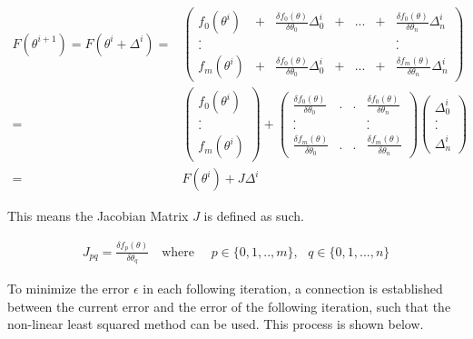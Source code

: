 \begin{align}
	F(\theta^{i+1}) = F(\theta^{i} + \Delta^{i}) =&
		\begin{pmatrix} f_0(\theta^{i}) &+& \frac{\delta f_0(\theta)}{\delta \theta_0} \Delta^{i}_0 &+& ... &+&  \frac{\delta f_0(\theta)}{\delta \theta_n} \Delta^{i}_n  \\
				. && && && . \\
				. && && && . \\
				f_m(\theta^{i}) &+& \frac{\delta f_0(\theta)}{\delta \theta_0} \Delta^{i}_0 &+& ... &+&  \frac{\delta f_m(\theta)}{\delta \theta_n} \Delta^{i}_n 
		\end{pmatrix} \label{eq:taylor1} \\
	=& \begin{pmatrix} f_0(\theta^{i}) \\ . \\ . \\ f_m(\theta^{i})  \end{pmatrix} +
		\begin{pmatrix} \frac{\delta f_0(\theta)}{\delta \theta_0} & . & . & \frac{\delta f_0(\theta)}{\delta \theta_n}  \\
					   . &&& . \\
					   . &&& . \\
					   \frac{\delta f_m(\theta)}{\delta \theta_0} & . & . & \frac{\delta f_m(\theta)}{\delta \theta_n}
		\end{pmatrix} \begin{pmatrix} \Delta^{i}_0 \\ . \\ . \\ \Delta^{i}_n \end{pmatrix}  \label{eq:taylor2} \\
	=& F(\theta^{i}) + J \Delta^{i} \label{eq:taylor3}
\end{align}

This means the Jacobian Matrix $J$ is defined as such.

\begin{align}
	J_{pq} = \frac{\delta f_p(\theta)}{\delta \theta_q} \quad \text{where } \quad p \in \{0,1,..,m\},\text{ } q \in \{0,1,...,n\}
\end{align}

To minimize the error $\epsilon$ in each following iteration, a connection is established between the current error and the
error of the following iteration, such that the non-linear least squared method can be used. This process is shown below.


